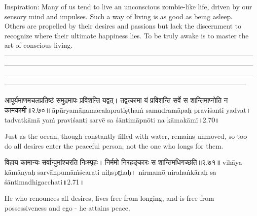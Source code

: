 Inspiration:
Many of us tend to live an unconscious zombie-like life, driven by our sensory mind and impulses. Such a way of living is as good as being asleep. Others are propelled by their desires and passions but lack the discernment to recognize where their ultimate happiness lies. To be truly awake is to master the art of conscious living.
—------------------------------------------------------------------------------------------------------------------------------------------------------------------------------------------------------------------------------------------------------------------------------------------------------------------------------------------------------------------------------------------------------------------------------------------

आपूर्यमाणमचलप्रतिष्ठं समुद्रमापः प्रविशन्ति यद्वत्। 
तद्वत्कामा यं प्रविशन्ति सर्वे स शान्तिमाप्नोति न कामकामी॥२.७०॥
āpūryamāṇamacalapratiṣṭhaṁ samudramāpaḥ praviśanti yadvat। 
tadvatkāmā yaṁ praviśanti sarvē sa śāntimāpnōti na kāmakāmī॥2.70॥

Just as the ocean, though constantly filled with water, remains unmoved, so too do all desires enter the peaceful person, not the one who longs for them.


विहाय कामान्यः सर्वान्पुमांश्चरति निःस्पृहः। 
निर्ममो निरहङ्कारः स शान्तिमधिगच्छति॥२.७१॥
vihāya kāmānyaḥ sarvānpumāṁścarati niḥspr̥haḥ। 
nirmamō nirahaṅkāraḥ sa śāntimadhigacchati॥2.71॥

He who renounces all desires, lives free from longing, and is free from possessiveness and ego - he attains peace. 

